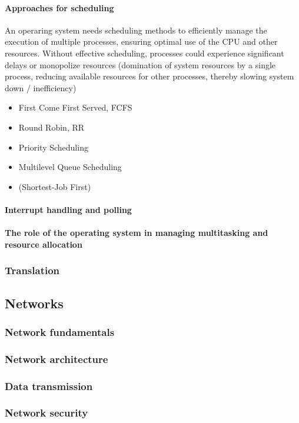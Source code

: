 \documentclass[a4paper,12pt]{article}
\begin{document}
\paragraph{Approaches for scheduling}
An operaring system needs scheduling methods to efficiently manage the execution of multiple processes, ensuring optimal use of the CPU and other resources. Without effective scheduling, processes could experience significant delays or monopolize resources (domination of system resources by a single process, reducing available resources for other processes, thereby slowing system down / inefficiency)
\begin{itemize}
    \item First Come First Served, FCFS
    \item Round Robin, RR
    \item Priority Scheduling
    \item Multilevel Queue Scheduling
    \item (Shortest-Job First)
\end{itemize}
\paragraph{Interrupt handling and polling}
\paragraph{The role of the operating system in managing multitasking and resource allocation}
\subsubsection{Translation}
\subsection{Networks}
\subsubsection{Network fundamentals}
\subsubsection{Network architecture}
\subsubsection{Data transmission}
\subsubsection{Network security}
\end{document}
